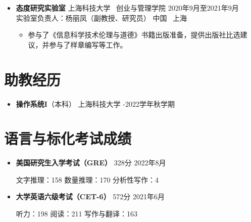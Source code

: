 \documentclass[a4paper,10pt]{ctexart} %
\begin{document}
    \begin{itemize}
        \item \textbf{态度研究实验室} \quad 上海科技大学 \, 创业与管理学院 \hfill 2020年9月至2021年9月 \\
        {\small 实验室负责人：杨丽凤（副教授、研究员）} \hfill 中国 \, 上海
        \begin{small}
            \begin{itemize}
                \item 参与了《信息科学技术伦理与道德》书籍出版准备，提供出版社比选建议，并参与了样章编写等工作。
            \end{itemize}
        \end{small}
    \end{itemize}



\section{助教经历}

    \begin{itemize}
        \item \textbf{操作系统I}（本科） \hfill 上海科技大学 -2022学年秋学期
    \end{itemize}



\section{语言与标化考试成绩}

    \begin{itemize}
        \item \textbf{美国研究生入学考试（GRE）} \quad 328分 \hfill 2022年8月 \\
        \begin{small}
            文字推理：158 \quad 数量推理：170 \quad 分析性写作：4
        \end{small}
        \item \textbf{大学英语六级考试（CET-6）} \quad 572分 \hfill 2021年6月 \\
        \begin{small}
            听力：198 \quad 阅读：211 \quad 写作与翻译：163
        \end{small}
    \end{itemize}
\end{document}
